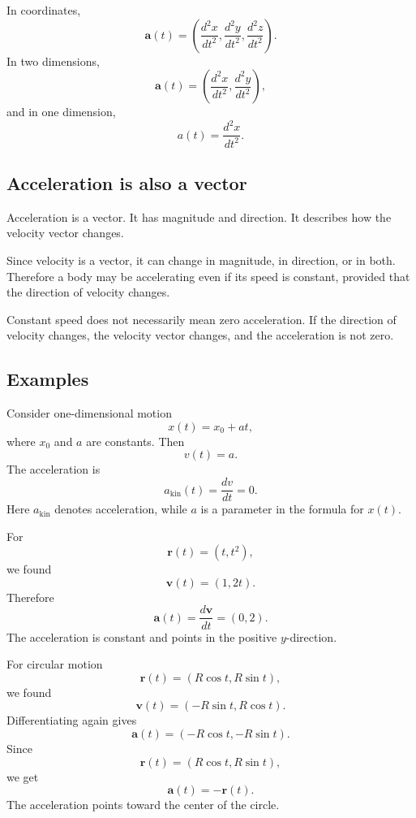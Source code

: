 In coordinates,
\[
\mathbf{a}(t)=
\left(
\frac{d^2x}{dt^2},
\frac{d^2y}{dt^2},
\frac{d^2z}{dt^2}
\right).
\]
In two dimensions,
\[
\mathbf{a}(t)=
\left(
\frac{d^2x}{dt^2},
\frac{d^2y}{dt^2}
\right),
\]
and in one dimension,
\[
a(t)=\frac{d^2x}{dt^2}.
\]

\subsection{Acceleration is also a vector}

Acceleration is a vector. It has magnitude and direction. It describes how the velocity vector changes.

Since velocity is a vector, it can change in magnitude, in direction, or in both. Therefore a body may be accelerating even if its speed is constant, provided that the direction of velocity changes.

\begin{remarkbox}
Constant speed does not necessarily mean zero acceleration. If the direction of velocity changes, the velocity vector changes, and the acceleration is not zero.
\end{remarkbox}

\subsection{Examples}

\begin{examplebox}
Consider one-dimensional motion
\[
x(t)=x_0+at,
\]
where \(x_0\) and \(a\) are constants. Then
\[
v(t)=a.
\]
The acceleration is
\[
a_{\mathrm{kin}}(t)=\frac{dv}{dt}=0.
\]
Here \(a_{\mathrm{kin}}\) denotes acceleration, while \(a\) is a parameter in the formula for \(x(t)\).
\end{examplebox}

\begin{examplebox}
For
\[
\mathbf{r}(t)=(t,t^2),
\]
we found
\[
\mathbf{v}(t)=(1,2t).
\]
Therefore
\[
\mathbf{a}(t)=\frac{d\mathbf{v}}{dt}=(0,2).
\]
The acceleration is constant and points in the positive \(y\)-direction.
\end{examplebox}

\begin{examplebox}
For circular motion
\[
\mathbf{r}(t)=(R\cos t,R\sin t),
\]
we found
\[
\mathbf{v}(t)=(-R\sin t,R\cos t).
\]
Differentiating again gives
\[
\mathbf{a}(t)=(-R\cos t,-R\sin t).
\]
Since
\[
\mathbf{r}(t)=(R\cos t,R\sin t),
\]
we get
\[
\mathbf{a}(t)=-\mathbf{r}(t).
\]
The acceleration points toward the center of the circle.
\end{examplebox}


